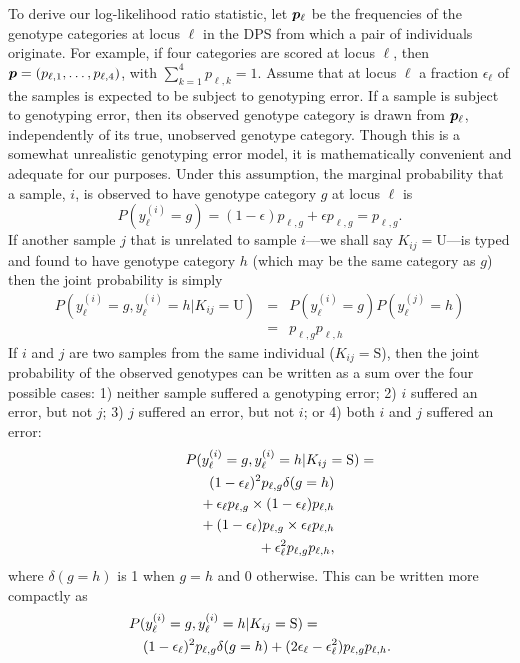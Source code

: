 To derive our log-likelihood ratio statistic, let $\bp_\ell$ 
be the frequencies of the genotype categories at locus $\ell$ in the DPS from which a pair of individuals
originate.  For example, if four categories are 
scored at locus $\ell$, then $\bp = (p_{\ell,1}, \ldots, p_{\ell,4})$, with $\sum_{k=1}^4 p_{\ell,k} = 1$.
Assume that at locus $\ell$ a fraction $\epsilon_\ell$ of the samples is expected to be subject to 
genotyping error.  If a sample is subject to genotyping error, then its observed genotype category
is drawn from $\bp_\ell$, independently of its true, unobserved genotype category. Though this is
a somewhat unrealistic genotyping error model, it is mathematically convenient and adequate for
our purposes.  Under this assumption,
the marginal probability that a sample, $i$, is observed to have genotype category $g$ at locus $\ell$ is
\[
P(y^{(i)}_\ell = g) = (1-\epsilon)p_{\ell,g} + \epsilon p_{\ell,g} = p_{\ell,g}.
\]
If another sample $j$ that is unrelated to sample $i$---we shall say $K_{ij} = \mathrm{U}$---is typed
and found to have genotype category $h$ (which may be the same category as $g$) then the joint probability is simply
\begin{eqnarray}
P(y^{(i)}_\ell = g, y^{(i)}_\ell = h | K_{ij} = \mathrm{U}) &=& P(y^{(i)}_\ell = g)P(y^{(j)}_\ell = h)  \nonumber \\
& = & p_{\ell,g} p_{\ell,h}  \label{eq:pairU}
\end{eqnarray}
If $i$ and $j$ are two samples from the same individual ($K_{ij} = \mathrm{S}$), then the joint probability of the observed genotypes
can be written as a sum over the four possible cases: 1) neither sample suffered a genotyping error; 2) $i$ suffered
an error, but not $j$; 3) $j$ suffered an error, but not $i$; or 4) both $i$ and $j$ suffered an error:
\begin{eqnarray*}
\lefteqn{P(y^{(i)}_\ell = g, y^{(i)}_\ell = h | K_{ij} = \mathrm{S})  =} \\
& & (1-\epsilon_\ell)^2  p_{\ell,g}  \delta(g = h)  \\
& & \mbox{} + \epsilon_\ell p_{\ell,g} \times (1-\epsilon_\ell) p_{\ell,h}  \\
& & \mbox{} + (1-\epsilon_\ell)p_{\ell,g} \times \epsilon_\ell p_{\ell,h} \\
& & \mbox{} + \epsilon_\ell^2 p_{\ell,g} p_{\ell,h},
\end{eqnarray*}
where $\delta(g = h)$ is 1 when $g=h$ and 0 otherwise.  This can be written more compactly as
\begin{eqnarray}
\lefteqn{P(y^{(i)}_\ell = g, y^{(i)}_\ell = h | K_{ij} = \mathrm{S})  =} \\ \nonumber
& & (1-\epsilon_\ell)^2  p_{\ell,g}  \delta(g = h) + (2\epsilon_\ell - \epsilon_\ell^2) p_{\ell,g} p_{\ell,h}. \label{eq:pairS}
\end{eqnarray}

